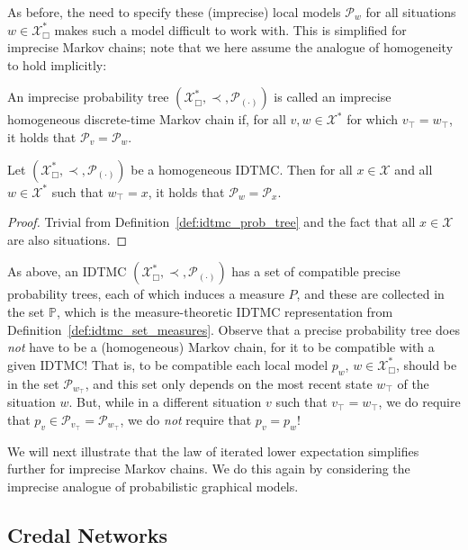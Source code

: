 \documentclass[graybox]{svmult}
\newcommand{\states}{\mathcal{X}}
\begin{document}
As before, the need to specify these (imprecise) local models $\mathcal{P}_w$ for all situations $w\in\states^*_\Box$ makes such a model difficult to work with. This is simplified for imprecise Markov chains; note that we here assume the analogue of homogeneity to hold implicitly:
\begin{definition}\label{def:idtmc_prob_tree}
An imprecise probability tree $(\states^*_\Box,\prec,\mathcal{P}_{(\cdot)})$ is called an imprecise homogeneous discrete-time Markov chain if, for all $v,w\in\states^*$ for which $v_\top=w_\top$, it holds that $\mathcal{P}_v=\mathcal{P}_w$.
\end{definition}
\begin{corollary}
Let $(\states^*_\Box,\prec,\mathcal{P}_{(\cdot)})$ be a homogeneous IDTMC. Then for all $x\in\states$ and all $w\in\states^*$ such that $w_\top=x$, it holds that $\mathcal{P}_w=\mathcal{P}_x$.
\end{corollary}
\begin{proof}
Trivial from Definition~\ref{def:idtmc_prob_tree} and the fact that all $x\in\states$ are also situations.
\end{proof}
As above, an IDTMC $(\states^*_\Box,\prec,\mathcal{P}_{(\cdot)})$ has a set of compatible precise probability trees, each of which induces a measure $P$, and these are collected in the set $\mathbb{P}$, which is the measure-theoretic IDTMC representation from Definition~\ref{def:idtmc_set_measures}. Observe that a precise probability tree does \emph{not} have to be a (homogeneous) Markov chain, for it to be compatible with a given IDTMC! That is, to be compatible each local model $p_w$, $w\in\states^*_\Box$, should be in the set $\mathcal{P}_{w_\top}$, and this set only depends on the most recent state $w_\top$ of the situation $w$. But, while in a different situation $v$ such that $v_\top=w_\top$, we do require that $p_v\in\mathcal{P}_{v_\top}=\mathcal{P}_{w_\top}$, we do \emph{not} require that $p_v=p_w$!

We will next illustrate that the law of iterated lower expectation simplifies further for imprecise Markov chains. We do this again by considering the imprecise analogue of probabilistic graphical models.

\subsection{Credal Networks}
\end{document}

